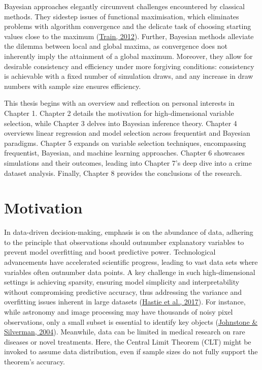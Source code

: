 \documentclass[
  11pt,
]{article}
\begin{document}
Bayesian approaches elegantly circumvent challenges encountered by
classical methods. They sidestep issues of functional maximisation,
which eliminates problems with algorithm convergence and the delicate
task of choosing starting values close to the maximum
(\protect\hyperlink{ref-Train2012}{Train, 2012}). Further, Bayesian
methods alleviate the dilemma between local and global maxima, as
convergence does not inherently imply the attainment of a global
maximum. Moreover, they allow for desirable consistency and efficiency
under more forgiving conditions: consistency is achievable with a fixed
number of simulation draws, and any increase in draw numbers with sample
size ensures efficiency.

This thesis begins with an overview and reflection on personal interests
in Chapter 1. Chapter 2 details the motivation for high-dimensional
variable selection, while Chapter 3 delves into Bayesian inference
theory. Chapter 4 overviews linear regression and model selection across
frequentist and Bayesian paradigms. Chapter 5 expands on variable
selection techniques, encompassing frequentist, Bayesian, and machine
learning approaches. Chapter 6 showcases simulations and their outcomes,
leading into Chapter 7's deep dive into a crime dataset analysis.
Finally, Chapter 8 provides the conclusions of the research.

\newpage

\section{Motivation}

In data-driven decision-making, emphasis is on the abundance of data,
adhering to the principle that observations should outnumber explanatory
variables to prevent model overfitting and boost predictive power.
Technological advancements have accelerated scientific progress, leading
to vast data sets where variables often outnumber data points. A key
challenge in such high-dimensional settings is achieving sparsity,
ensuring model simplicity and interpretability without compromising
predictive accuracy, thus addressing the variance and overfitting issues
inherent in large datasets (\protect\hyperlink{ref-Hastie2017}{Hastie et
al., 2017}). For instance, while astronomy and image processing may have
thousands of noisy pixel observations, only a small subset is essential
to identify key objects (\protect\hyperlink{ref-Johnstone2004}{Johnstone
\& Silverman, 2004}). Meanwhile, data can be limited in medical research
on rare diseases or novel treatments. Here, the Central Limit Theorem
(CLT) might be invoked to assume data distribution, even if sample sizes
do not fully support the theorem's accuracy.
\end{document}

